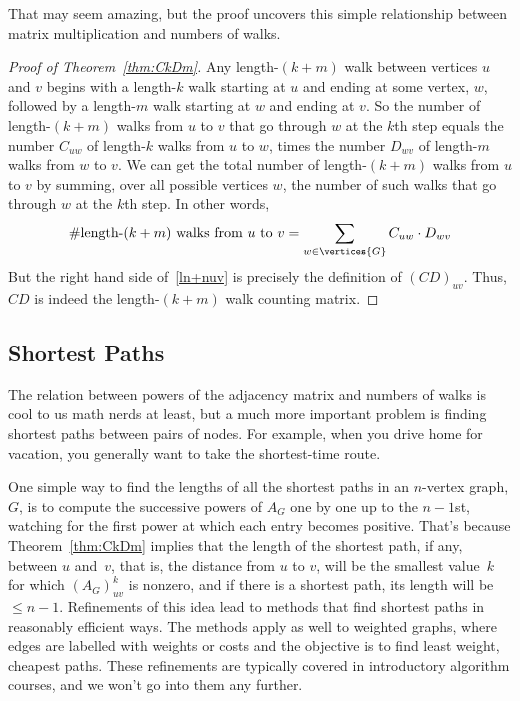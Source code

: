 That may seem amazing, but the proof uncovers this simple relationship
between matrix multiplication and numbers of walks.

\begin{editingnotes}
\end{editingnotes}

\begin{proof}[Proof of Theorem~\ref{thm:CkDm}]
  Any length-$(k+m)$ walk between vertices $u$ and $v$ begins with a
  length-$k$ walk starting at $u$ and ending at some vertex, $w$,
  followed by a length-$m$ walk starting at $w$ and ending at $v$.  So
  the number of length-$(k+m)$ walks from $u$ to $v$ that go through
  $w$ at the $k$th step equals the number $C_{uw}$ of length-$k$ walks
  from $u$ to $w$, times the number $D_{wv}$ of length-$m$ walks from
  $w$ to $v$.  We can get the total number of length-$(k+m)$ walks
  from $u$ to $v$ by summing, over all possible vertices $w$, the
  number of such walks that go through $w$ at the $k$th step.  In
  other words,
\begin{equation}\label{ln+nuv}
\text{\#length-$(k+m)$ walks from $u$ to $v$} =
              \sum_{w \in \vertices{G}} C_{uw}\cdot D_{wv}
\end{equation}
But the right hand side of~\eqref{ln+nuv} is precisely the definition of
$(CD)_{uv}$.  Thus, $CD$ is indeed the length-$(k+m)$ walk counting matrix.
\end{proof}


\subsection{Shortest Paths}
The relation between powers of the adjacency matrix and numbers of
walks is cool to us math nerds at least, but a much more important
problem is finding  shortest paths between
pairs of nodes.  For example, when you drive home for vacation, you
generally want to take the shortest-time route.

One simple way to find the lengths of all the shortest paths in an
$n$-vertex graph, $G$, is to compute the successive powers of $A_G$
one by one up to the $n-1$st, watching for the first power at which
each entry becomes positive.  That's because Theorem~\ref{thm:CkDm}
implies that the length of the shortest path, if any, between $u$
and~$v$, that is, the distance from $u$ to $v$, will be the smallest
value~$k$ for which $(A_G)_{uv}^k$ is nonzero, and if there is a
shortest path, its length will be $\leq n-1$.  Refinements of this
idea lead to methods that find shortest paths in reasonably efficient
ways.  The methods apply as well to weighted graphs, where edges are
labelled with weights or costs and the objective is to find least
weight, cheapest paths.  These refinements are typically covered in
introductory algorithm courses, and we won't go into them any
further.

